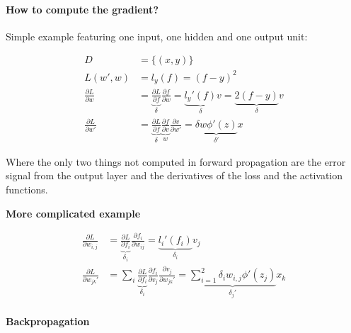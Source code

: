 \documentclass[8pt,a4paper]{scrartcl}
\begin{document}
\begin{multicols*}{3}
\paragraph{How to compute the gradient?}

Simple example featuring one input, one hidden and one output unit:



\begin{align*}
D&=\{(x,y)\}\\
L(w',w)&=l_y(f)=(f-y)^2\\
\frac{\partial L}{\partial w}&=\underbrace{\frac{\partial L}{\partial f}}_{\delta}\frac{\partial f}{\partial w}=\underbrace{l_y'(f)}_\delta v=\underbrace{2(f-y)}_\delta v\\
\frac{\partial L}{\partial w'}&=\underbrace{\frac{\partial L}{\partial f}}_{\delta}
\underbrace{\frac{\partial f}{\partial v}}_w
\frac{\partial v}{\partial w'}=\underbrace{\delta w\phi'(z)}_{\delta'} x
\end{align*}

Where the only two things not computed in forward propagation are the error signal from the output layer and the derivatives of the loss and the activation functions.

\textbf{More complicated example}


\begin{align*}
\frac{\partial L}{\partial w_{i,j}}&=\underbrace{\frac{\partial L}{\partial f_i}}_{\delta_i}\frac{\partial f_i}{\partial w_{ij}}=\underbrace{l_i'(f_i)}_{\delta_i}v_j\\
\frac{\partial L}{\partial w_{jk}'}&=\sum\limits_i\underbrace{\frac{\partial L}{\partial f_i}}_{\delta_i}\frac{\partial f_i}{\partial v_j}\frac{\partial v_j}{\partial w_{jk}'}=\underbrace{\sum\limits_{i=1}^2\delta_i w_{i,j}\phi'(z_j)}_{\delta_j'}x_k
\end{align*}

\paragraph{Backpropagation}


\end{multicols*}
\end{document}
